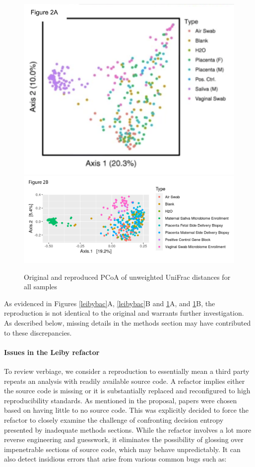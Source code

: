 \documentclass{drexelthesis}
\begin{document}
\newpage

\begin{figure}[h!]
	\centering
	\includegraphics[width=\textwidth]{./images/pcaorig.png}
	\includegraphics[width=\textwidth]{./images/pcarepro.png}
	\caption{Original and reproduced PCoA of unweighted UniFrac distances for all samples}
	\label{leibypca}
\end{figure}

As evidenced in Figures \ref{leibybac}A, \ref{leibybac}B and \ref{leibypca}A, and \ref{leibypca}B, the reproduction is not identical to the original and warrants further investigation. As described below, missing details in the methods section may have contributed to these discrepancies.

\paragraph{Issues in the Leiby refactor}

To review verbiage, we consider a reproduction to essentially mean a third party repeats an analysis with readily available source code. A refactor implies either the source code is missing or it is substantially replaced and reconfigured to high reproducibility standards. As mentioned in the proposal, papers were chosen based on having little to no source code. This was explicitly decided to force the refactor to closely examine the challenge of confronting decision entropy presented by inadequate methods sections. While the refactor involves a lot more reverse engineering and guesswork, it eliminates the possibility of glossing over impenetrable sections of source code, which may behave unpredictably. It can also detect insidious errors that arise from various common bugs such as:
\end{document}
